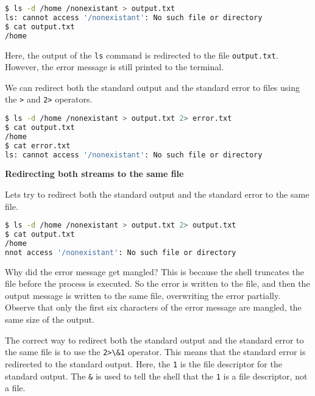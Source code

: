 \begin{lstlisting}[language=bash]
$ ls -d /home /nonexistant > output.txt
ls: cannot access '/nonexistant': No such file or directory
$ cat output.txt
/home
\end{lstlisting}

Here, the output of the \lstinline|ls| command is redirected to the file
\lstinline|output.txt|. However, the error message is still printed to
the terminal.

We can redirect both the standard output and the standard error to
files using the \lstinline|>| and \lstinline|2>| operators.

\begin{lstlisting}[language=bash]
$ ls -d /home /nonexistant > output.txt 2> error.txt
$ cat output.txt
/home
$ cat error.txt
ls: cannot access '/nonexistant': No such file or directory
\end{lstlisting}

\textbf{Redirecting both streams to the same file}

Lets try to redirect both the standard output and the standard error
to the same file.

\begin{lstlisting}[language=bash]
$ ls -d /home /nonexistant > output.txt 2> output.txt
$ cat output.txt
/home
nnot access '/nonexistant': No such file or directory
\end{lstlisting}

Why did the error message get mangled? This is because the shell
truncates the file before the process is executed. So the error
is written to the file, and then the output message is written to
the same file, overwriting the error partially.
Observe that only the first six characters of the
error message are mangled, the same size of the output.

The correct way to redirect both the standard output and the standard
error to the same file is to use the \lstinline|2>\&1| operator.
This means that the standard error is redirected to the standard output.
Here, the \lstinline|1| is the file descriptor for the standard output.
The \lstinline|&| is used to tell the shell that the \lstinline|1| is a file
descriptor, not a file.

